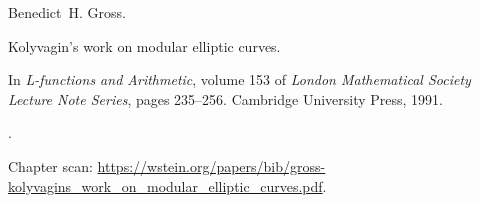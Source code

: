 Benedict~H. Gross.

\newblock Kolyvagin's work on modular elliptic curves.

\newblock In \emph{L-functions and Arithmetic}, volume 153 of \emph{London
  Mathematical Society Lecture Note Series}, pages 235--256. Cambridge
  University Press, 1991.

\newblock {}.

\newblock Chapter scan: \url{https://wstein.org/papers/bib/gross-kolyvagins_work_on_modular_elliptic_curves.pdf}.


